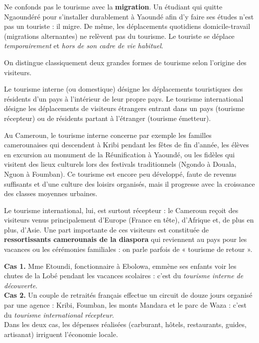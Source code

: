 \documentclass[11pt]{article}
\newcommand{\cle}[1]{{\popxbold\color{popdark}#1}}
\newcounter{popsec}
\newcounter{popsub}
\newcommand{\courssub}[1]{%
  \stepcounter{popsub}%
  \par\vspace{9pt}\noindent{\popxbold\fontsize{11.5}{13}\selectfont\color{popink}{\color{poporange}\thepopsec.\thepopsub}\hspace{6pt}#1}\par\nopagebreak\vspace{4pt}
}
\begin{document}
\begin{attention}
Ne confonds pas le tourisme avec la \textbf{migration}. Un étudiant qui quitte Ngaoundéré pour s'installer durablement à Yaoundé afin d'y faire ses études n'est pas un touriste : il migre. De même, les déplacements quotidiens domicile-travail (migrations alternantes) ne relèvent pas du tourisme. Le touriste se déplace \emph{temporairement} et \emph{hors de son cadre de vie habituel}.
\end{attention}

\courssub{Tourisme interne et tourisme international}

On distingue classiquement deux grandes formes de tourisme selon l'origine des visiteurs.

\begin{definition}
Le \cle{tourisme interne} (ou domestique) désigne les déplacements touristiques des résidents d'un pays à l'intérieur de leur propre pays. Le \cle{tourisme international} désigne les déplacements de visiteurs étrangers entrant dans un pays (tourisme récepteur) ou de résidents partant à l'étranger (tourisme émetteur).
\end{definition}

Au Cameroun, le tourisme interne concerne par exemple les familles camerounaises qui descendent à Kribi pendant les fêtes de fin d'année, les élèves en excursion au monument de la Réunification à Yaoundé, ou les fidèles qui visitent des lieux culturels lors des festivals traditionnels (Ngondo à Douala, Nguon à Foumban). Ce tourisme est encore peu développé, faute de revenus suffisants et d'une culture des loisirs organisés, mais il progresse avec la croissance des classes moyennes urbaines.

Le tourisme international, lui, est surtout récepteur : le Cameroun reçoit des visiteurs venus principalement d'Europe (France en tête), d'Afrique et, de plus en plus, d'Asie. Une part importante de ces visiteurs est constituée de \textbf{ressortissants camerounais de la diaspora} qui reviennent au pays pour les vacances ou les cérémonies familiales : on parle parfois de « tourisme de retour ».

\begin{exemplebox}
\textbf{Cas 1.} Mme Etoundi, fonctionnaire à Ebolowa, emmène ses enfants voir les chutes de la Lobé pendant les vacances scolaires : c'est du \emph{tourisme interne de découverte}.\\
\textbf{Cas 2.} Un couple de retraités français effectue un circuit de douze jours organisé par une agence : Kribi, Foumban, les monts Mandara et le parc de Waza : c'est du \emph{tourisme international récepteur}.\\
Dans les deux cas, les dépenses réalisées (carburant, hôtels, restaurants, guides, artisanat) irriguent l'économie locale.
\end{exemplebox}
\end{document}
